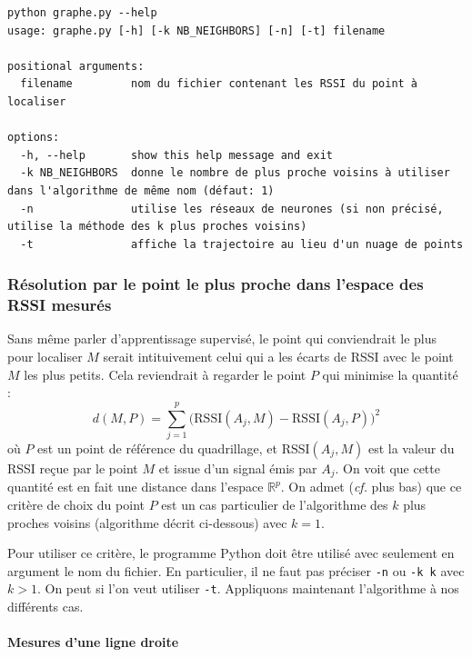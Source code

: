 \documentclass[french, a4paper, 12pt, parskip]{scrartcl}
\begin{document}
\begin{verbatim}
python graphe.py --help
usage: graphe.py [-h] [-k NB_NEIGHBORS] [-n] [-t] filename

positional arguments:
  filename         nom du fichier contenant les RSSI du point à localiser

options:
  -h, --help       show this help message and exit
  -k NB_NEIGHBORS  donne le nombre de plus proche voisins à utiliser dans l'algorithme de même nom (défaut: 1)
  -n               utilise les réseaux de neurones (si non précisé, utilise la méthode des k plus proches voisins)
  -t               affiche la trajectoire au lieu d'un nuage de points
\end{verbatim}

\subsubsection{Résolution par le point le plus proche dans l'espace des RSSI mesurés}

Sans même parler d'apprentissage supervisé, le point qui conviendrait le plus
pour localiser $M$ serait intituivement celui qui a les écarts de RSSI avec le
point $M$ les plus petits. Cela reviendrait à regarder le point $P$ qui
minimise la quantité :
\[
  d(M, P) = \sum_{j=1}^p \bigl(\mathrm{RSSI}(A_j, M) - \mathrm{RSSI}(A_j, P)\bigr)^2
\]
où $P$ est un point de référence du quadrillage, et $\mathrm{RSSI}(A_j, M)$ est
la valeur du RSSI reçue par le point $M$ et issue d'un signal émis par $A_j$.
On voit que cette quantité est en fait une distance dans l'espace
$\mathbb{R}^p$. On admet (\textit{cf.} plus bas) que ce critère de choix du
point $P$ est un cas particulier de l'algorithme des $k$ plus proches voisins
(algorithme décrit ci-dessous) avec $k=1$.

Pour utiliser ce critère, le programme Python doit être utilisé avec seulement
en argument le nom du fichier. En particulier, il ne faut pas préciser
\verb+-n+ ou \verb+-k k+ avec $k>1$. On peut si l'on veut utiliser \verb+-t+.
Appliquons maintenant l'algorithme à nos différents cas.

\paragraph{Mesures d'une ligne droite}
\end{document}
